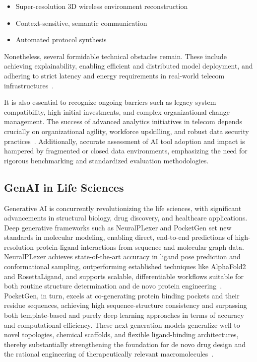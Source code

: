 \begin{itemize}
    \item Super-resolution 3D wireless environment reconstruction
    \item Context-sensitive, semantic communication
    \item Automated protocol synthesis
\end{itemize}

Nonetheless, several formidable technical obstacles remain. These include achieving explainability, enabling efficient and distributed model deployment, and adhering to strict latency and energy requirements in real-world telecom infrastructures~\cite{ref8,ref15}.

It is also essential to recognize ongoing barriers such as legacy system compatibility, high initial investments, and complex organizational change management. The success of advanced analytics initiatives in telecom depends crucially on organizational agility, workforce upskilling, and robust data security practices~\cite{ref19}. Additionally, accurate assessment of AI tool adoption and impact is hampered by fragmented or closed data environments, emphasizing the need for rigorous benchmarking and standardized evaluation methodologies.

\subsection{GenAI in Life Sciences}

Generative AI is concurrently revolutionizing the life sciences, with significant advancements in structural biology, drug discovery, and healthcare applications. Deep generative frameworks such as NeuralPLexer and PocketGen set new standards in molecular modeling, enabling direct, end-to-end predictions of high-resolution protein-ligand interactions from sequence and molecular graph data. NeuralPLexer achieves state-of-the-art accuracy in ligand pose prediction and conformational sampling, outperforming established techniques like AlphaFold2 and RosettaLigand, and supports scalable, differentiable workflows suitable for both routine structure determination and de novo protein engineering~\cite{ref4}. PocketGen, in turn, excels at co-generating protein binding pockets and their residue sequences, achieving high sequence-structure consistency and surpassing both template-based and purely deep learning approaches in terms of accuracy and computational efficiency. These next-generation models generalize well to novel topologies, chemical scaffolds, and flexible ligand-binding architectures, thereby substantially strengthening the foundation for de novo drug design and the rational engineering of therapeutically relevant macromolecules~\cite{ref5}.

